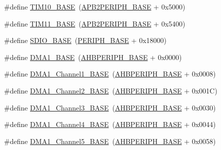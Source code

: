 \begin{DoxyCompactItemize}
\item 
\#define \hyperlink{group___peripheral__memory__map_ga3eff32f3801db31fb4b61d5618cad54a}{T\+I\+M10\+\_\+\+B\+A\+SE}~(\hyperlink{group___peripheral__memory__map_ga25b99d6065f1c8f751e78f43ade652cb}{A\+P\+B2\+P\+E\+R\+I\+P\+H\+\_\+\+B\+A\+SE} + 0x5000)
\item 
\#define \hyperlink{group___peripheral__memory__map_ga3a4a06bb84c703084f0509e105ffaf1d}{T\+I\+M11\+\_\+\+B\+A\+SE}~(\hyperlink{group___peripheral__memory__map_ga25b99d6065f1c8f751e78f43ade652cb}{A\+P\+B2\+P\+E\+R\+I\+P\+H\+\_\+\+B\+A\+SE} + 0x5400)
\item 
\#define \hyperlink{group___peripheral__memory__map_ga95dd0abbc6767893b4b02935fa846f52}{S\+D\+I\+O\+\_\+\+B\+A\+SE}~(\hyperlink{group___peripheral__memory__map_ga9171f49478fa86d932f89e78e73b88b0}{P\+E\+R\+I\+P\+H\+\_\+\+B\+A\+SE} + 0x18000)
\item 
\#define \hyperlink{group___peripheral__memory__map_gab2d8a917a0e4ea99a22ac6ebf279bc72}{D\+M\+A1\+\_\+\+B\+A\+SE}~(\hyperlink{group___peripheral__memory__map_ga92eb5d49730765d2abd0f5b09548f9f5}{A\+H\+B\+P\+E\+R\+I\+P\+H\+\_\+\+B\+A\+SE} + 0x0000)
\item 
\#define \hyperlink{group___peripheral__memory__map_ga888dbc1608243badeb3554ffedc7364c}{D\+M\+A1\+\_\+\+Channel1\+\_\+\+B\+A\+SE}~(\hyperlink{group___peripheral__memory__map_ga92eb5d49730765d2abd0f5b09548f9f5}{A\+H\+B\+P\+E\+R\+I\+P\+H\+\_\+\+B\+A\+SE} + 0x0008)
\item 
\#define \hyperlink{group___peripheral__memory__map_ga38a70090eef3687e83fa6ac0c6d22267}{D\+M\+A1\+\_\+\+Channel2\+\_\+\+B\+A\+SE}~(\hyperlink{group___peripheral__memory__map_ga92eb5d49730765d2abd0f5b09548f9f5}{A\+H\+B\+P\+E\+R\+I\+P\+H\+\_\+\+B\+A\+SE} + 0x001\+C)
\item 
\#define \hyperlink{group___peripheral__memory__map_ga70b3d9f36ca9ce95b4e421c11154fe5d}{D\+M\+A1\+\_\+\+Channel3\+\_\+\+B\+A\+SE}~(\hyperlink{group___peripheral__memory__map_ga92eb5d49730765d2abd0f5b09548f9f5}{A\+H\+B\+P\+E\+R\+I\+P\+H\+\_\+\+B\+A\+SE} + 0x0030)
\item 
\#define \hyperlink{group___peripheral__memory__map_ga1adc93cd0baf0897202c71110e045692}{D\+M\+A1\+\_\+\+Channel4\+\_\+\+B\+A\+SE}~(\hyperlink{group___peripheral__memory__map_ga92eb5d49730765d2abd0f5b09548f9f5}{A\+H\+B\+P\+E\+R\+I\+P\+H\+\_\+\+B\+A\+SE} + 0x0044)
\item 
\#define \hyperlink{group___peripheral__memory__map_gac041a71cd6c1973964f847a68aa14478}{D\+M\+A1\+\_\+\+Channel5\+\_\+\+B\+A\+SE}~(\hyperlink{group___peripheral__memory__map_ga92eb5d49730765d2abd0f5b09548f9f5}{A\+H\+B\+P\+E\+R\+I\+P\+H\+\_\+\+B\+A\+SE} + 0x0058)

\end{DoxyCompactItemize}
